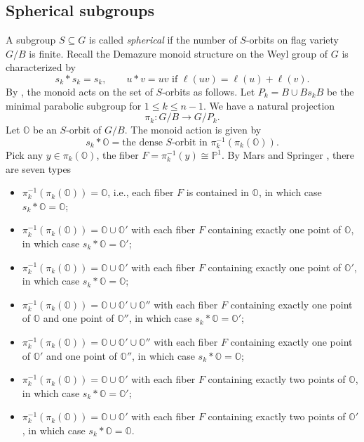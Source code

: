 \documentclass[12pt,reqno]{amsart}
\numberwithin{equation}{section}
\theoremstyle{definition}
\begin{document}
\subsection{Spherical subgroups}\label{spherical}
A subgroup $S\subseteq G$ is called \emph{spherical} if the number of $S$-orbits on flag variety $G/B$ is finite. 
Recall the Demazure monoid structure on the Weyl group  of $G$ is characterized by 
$$s_k*s_k=s_k,\qquad u*v=uv\text{ if $\ell(uv)=\ell(u)+\ell(v)$}.$$
By \cite[Section 3]{RS92}, the monoid acts on the set of $S$-orbits as follows. 
Let $P_k=B\cup Bs_kB$ be the minimal parabolic subgroup for $1\leq k\leq n-1$. 
We have a natural projection 
$$\pi_k: G/B\longrightarrow G/P_k. $$
Let $\mathbb{O}$ be an $S$-orbit of $G/B$. The monoid action is given by
$$s_k*\mathbb{O} = \text{the dense $S$-orbit in $\pi_k^{-1}(\pi_k(\mathbb{O}))$}.$$
Pick any $y\in \pi_k(\mathbb{O})$, the fiber $F=\pi_k^{-1}(y)\cong \mathbb{P}^1$. 
By Mars and Springer \cite{Mars}, there are seven types 
\begin{itemize}
    \item[(I)]  
    $\pi_k^{-1}(\pi_k(\mathbb{O})) = \mathbb{O}$, i.e., each fiber $F$ is contained in $\mathbb{O}$, in which case $s_k*\mathbb{O}=\mathbb{O}$; 
    \item[(IIa)] 
    $\pi_k^{-1}(\pi_k(\mathbb{O})) = \mathbb{O}\cup \mathbb{O}'$ with each fiber $F$ containing exactly one point of $\mathbb{O}$, in which case 
    $s_k*\mathbb{O}=\mathbb{O}'$; 
    
    \item[(IIb)]  
    $\pi_k^{-1}(\pi_k(\mathbb{O})) = \mathbb{O}\cup \mathbb{O}'$ with each fiber $F$ containing exactly one point of $\mathbb{O}'$, in which case 
    $s_k*\mathbb{O}=\mathbb{O}$; 

    \item[(IIIa)]   
    $\pi_k^{-1}(\pi_k(\mathbb{O})) =\mathbb{O}\cup \mathbb{O}'\cup \mathbb{O}''$ with each fiber $F$ containing exactly one point of $\mathbb{O}$ and one point of $\mathbb{O}''$, in which case $s_k*\mathbb{O}=\mathbb{O}'$; 
    
    \item[(IIIb)]   
    $\pi_k^{-1}(\pi_k(\mathbb{O})) =\mathbb{O}\cup \mathbb{O}'\cup \mathbb{O}''$ with each fiber $F$ containing exactly one point of $\mathbb{O}'$ and one point of $\mathbb{O}''$, in which case 
    $s_k*\mathbb{O}=\mathbb{O}$; 

    \item[(IVa)]   
    $\pi_k^{-1}(\pi_k(\mathbb{O})) =\mathbb{O}\cup \mathbb{O}'$ with each fiber $F$ containing exactly two points of $\mathbb{O}$, in which case $s_k*\mathbb{O}=\mathbb{O}'$; 

    \item[(IVb)]   
    $\pi_k^{-1}(\pi_k(\mathbb{O})) =\mathbb{O}\cup \mathbb{O}'$ with each fiber $F$ containing exactly two points of $\mathbb{O}'$, in which case $s_k*\mathbb{O}=\mathbb{O}$. 
\end{itemize}
\end{document}
